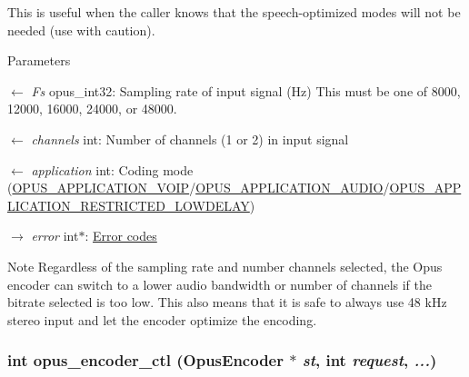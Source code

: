 This is useful when the caller knows that the speech-\/optimized modes will not be needed (use with caution). 
\begin{DoxyParams}{Parameters}
\item[\mbox{$\leftarrow$} {\em Fs}]{\ttfamily opus\_\-int32}: Sampling rate of input signal (Hz) This must be one of 8000, 12000, 16000, 24000, or 48000. \item[\mbox{$\leftarrow$} {\em channels}]{\ttfamily int}: Number of channels (1 or 2) in input signal \item[\mbox{$\leftarrow$} {\em application}]{\ttfamily int}: Coding mode (\hyperlink{group__opus__ctlvalues_ga07884aa018303a419d1f7acb2f3fa669}{OPUS\_\-APPLICATION\_\-VOIP}/\hyperlink{group__opus__ctlvalues_ga5909f7cb35c04f1110026c6889edd345}{OPUS\_\-APPLICATION\_\-AUDIO}/\hyperlink{group__opus__ctlvalues_ga592232fb39db60c1369989c5c5d19a07}{OPUS\_\-APPLICATION\_\-RESTRICTED\_\-LOWDELAY}) \item[\mbox{$\rightarrow$} {\em error}]{\ttfamily int$\ast$}: \hyperlink{group__opus__errorcodes}{Error codes} \end{DoxyParams}
\begin{DoxyNote}{Note}
Regardless of the sampling rate and number channels selected, the Opus encoder can switch to a lower audio bandwidth or number of channels if the bitrate selected is too low. This also means that it is safe to always use 48 kHz stereo input and let the encoder optimize the encoding. 
\end{DoxyNote}
\hypertarget{group__opus__encoder_ga164cbb0425238961919adf1db67949df}{
\subsubsection[{opus\_\-encoder\_\-ctl}]{\setlength{\rightskip}{0pt plus 5cm}int opus\_\-encoder\_\-ctl ({\bf OpusEncoder} $\ast$ {\em st}, \/  int {\em request}, \/   {\em ...})}}
\label{group__opus__encoder_ga164cbb0425238961919adf1db67949df}


